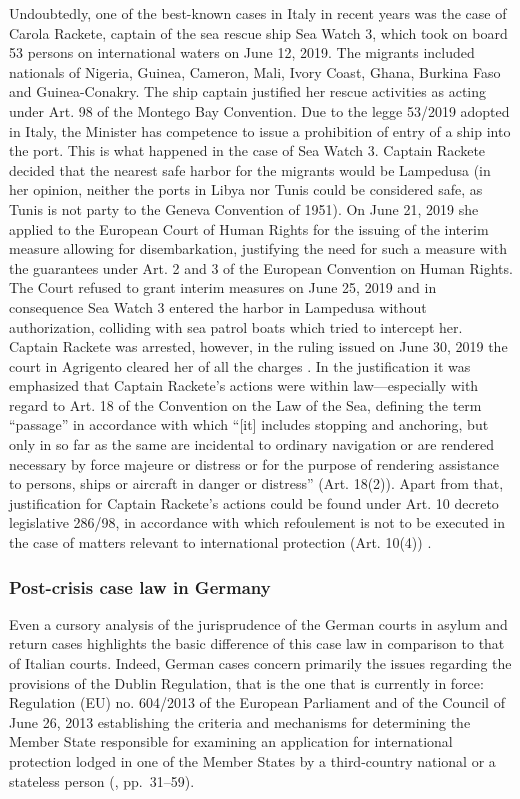 \documentclass[10pt,a4paper]{article}
\begin{document}
\begin{multicols}{2}
Undoubtedly, one of the best-known cases in Italy in recent years was the case of Carola Rackete, captain of the sea rescue ship Sea Watch 3, which took on board 53 persons on international waters on June 12, 2019. The migrants included nationals of Nigeria, Guinea, Cameron, Mali, Ivory Coast, Ghana, Burkina Faso and Guinea-Conakry. The ship captain justified her rescue activities as acting under Art. 98 of the Montego Bay Convention. Due to the legge 53/2019 adopted in Italy, the Minister has competence to issue a prohibition of entry of a ship into the port. This is what happened in the case of Sea Watch 3. Captain Rackete decided that the nearest safe harbor for the migrants would be Lampedusa (in her opinion, neither the ports in Libya nor Tunis could be considered safe, as Tunis is not party to the Geneva Convention of 1951). On June 21, 2019 she applied to the European Court of Human Rights for the issuing of the interim measure allowing for disembarkation, justifying the need for such a measure with the guarantees under Art. 2 and 3 of the European Convention on Human Rights. The Court refused to grant interim measures on June 25, 2019 \citep{R87} and in consequence Sea Watch 3 entered the harbor in Lampedusa without authorization, colliding with sea patrol boats which tried to intercept her. Captain Rackete was arrested, however, in the ruling issued on June 30, 2019 the court in Agrigento cleared her of all the charges \citep{R88}. In the justification it was emphasized that Captain Rackete's actions were within law---especially with regard to Art. 18 of the Convention on the Law of the Sea, defining the term ``passage'' in accordance with which ``[it] includes stopping and anchoring, but only in so far as the same are incidental to ordinary navigation or are rendered necessary by force majeure or distress or for the purpose of rendering assistance to persons, ships or aircraft in danger or distress'' (Art. 18(2)). Apart from that, justification for Captain Rackete’s actions could be found under Art. 10 decreto legislative 286/98, in accordance with which refoulement is not to be executed in the case of matters relevant to international protection (Art. 10(4)) \citep{R89}.

\subsubsection{Post-crisis case law in Germany}

\noindent Even a cursory analysis of the jurisprudence of the German courts in asylum and return cases highlights the basic difference of this case law in comparison to that of Italian courts. Indeed, German cases concern primarily the issues regarding the provisions of the Dublin Regulation, that is the one that is currently in force: Regulation (EU) no. 604/2013 of the European Parliament and of the Council of June 26, 2013 establishing the criteria and mechanisms for determining the Member State responsible for examining an application for international protection lodged in one of the Member States by a third-country national or a stateless person (\citep{R90}, pp.~31--59).


\end{multicols}
\end{document}
